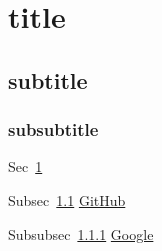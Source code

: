 \documentclass{article}
\begin{document}
\section{title}\label{sec:main}
\subsection{subtitle}\label{sec:sub}
\newpage

\subsubsection{subsubtitle}\label{sec:sub2}
\newpage

Sec~\ref{sec:main}
\newpage

Subsec~\ref{sec:sub}
\href{https://github.com}{GitHub}
\newpage

Subsubsec~\ref{sec:sub2}
\href{https://google.com}{Google}
\end{document}
